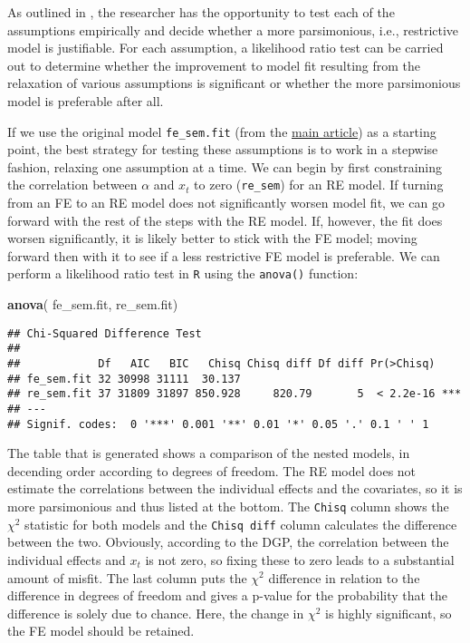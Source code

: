 \documentclass[]{interact}
\theoremstyle{plain}%
\theoremstyle{definition}
\theoremstyle{remark}
\newenvironment{Shaded}{\begin{snugshade}}{\end{snugshade}}
\newcommand{\KeywordTok}[1]{\textcolor[rgb]{0.13,0.29,0.53}{\textbf{#1}}}
\newcommand{\NormalTok}[1]{#1}
\begin{document}
\doublespacing

\singlespacing

\doublespacing

As outlined in \citet{Bollen2010}, the researcher has the opportunity to
test each of the assumptions empirically and decide whether a more
parsimonious, i.e., restrictive model is justifiable. For each
assumption, a likelihood ratio test can be carried out to determine
whether the improvement to model fit resulting from the relaxation of
various assumptions is significant or whether the more parsimonious
model is preferable after all.

If we use the original model \texttt{fe\_sem.fit} (from the
\href{https://github.com/henrik-andersen/FE-SEM/blob/master/article.pdf}{main
article}) as a starting point, the best strategy for testing these
assumptions is to work in a stepwise fashion, relaxing one assumption at
a time. We can begin by first constraining the correlation between
\(\alpha\) and \(x_{t}\) to zero (\texttt{re\_sem}) for an RE model. If
turning from an FE to an RE model does not significantly worsen model
fit, we can go forward with the rest of the steps with the RE model. If,
however, the fit does worsen significantly, it is likely better to stick
with the FE model; moving forward then with it to see if a less
restrictive FE model is preferable. We can perform a likelihood ratio
test in \texttt{R} using the \texttt{anova()} function:

\small
\singlespacing

\begin{Shaded}
\begin{Highlighting}[]
\KeywordTok{anova}\NormalTok{( fe\_sem.fit, re\_sem.fit)}
\end{Highlighting}
\end{Shaded}

\begin{verbatim}
## Chi-Squared Difference Test
## 
##            Df   AIC   BIC   Chisq Chisq diff Df diff Pr(>Chisq)    
## fe_sem.fit 32 30998 31111  30.137                                  
## re_sem.fit 37 31809 31897 850.928     820.79       5  < 2.2e-16 ***
## ---
## Signif. codes:  0 '***' 0.001 '**' 0.01 '*' 0.05 '.' 0.1 ' ' 1
\end{verbatim}

\doublespacing
\normalsize

The table that is generated shows a comparison of the nested models, in
decending order according to degrees of freedom. The RE model does not
estimate the correlations between the individual effects and the
covariates, so it is more parsimonious and thus listed at the bottom.
The \texttt{Chisq} column shows the \(\chi^{2}\) statistic for both
models and the \texttt{Chisq\ diff} column calculates the difference
between the two. Obviously, according to the DGP, the correlation
between the individual effects and \(x_{t}\) is not zero, so fixing
these to zero leads to a substantial amount of misfit. The last column
puts the \(\chi^{2}\) difference in relation to the difference in
degrees of freedom and gives a p-value for the probability that the
difference is solely due to chance. Here, the change in \(\chi^{2}\) is
highly significant, so the FE model should be retained.
\end{document}
